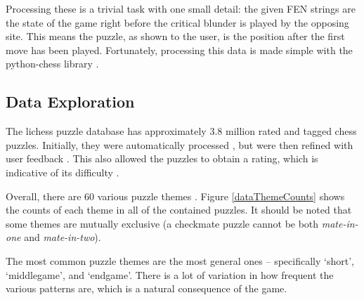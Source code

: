 Processing these is a trivial task with one small detail: the given FEN strings
are the state of the game right before the critical blunder is played by the
opposing site. This means the puzzle, as shown to the user, is the position
after the first move has been played. Fortunately, processing this data is made
simple with the python-chess library \citep{pythonChess}.

\subsection{Data Exploration}

The lichess puzzle database has approximately 3.8 million rated and tagged
chess puzzles. Initially, they were automatically processed
\citep{lichessTagger}, but were then refined with user feedback
\citep{lichessPuzzles}. This also allowed the puzzles to obtain a rating, which
is indicative of its difficulty \citep{lichessPuzzles}.

Overall, there are 60 various puzzle themes \citep{lichessXML}. Figure
\ref{dataThemeCounts} shows the counts of each theme in all of the contained
puzzles. It should be noted that some themes are mutually exclusive (a
checkmate puzzle cannot be both \emph{mate-in-one} and \emph{mate-in-two}).

The most common puzzle themes are the most general ones -- specifically
`short', `middlegame', and `endgame'. There is a lot of variation in how
frequent the various patterns are, which is a natural consequence of the game.

